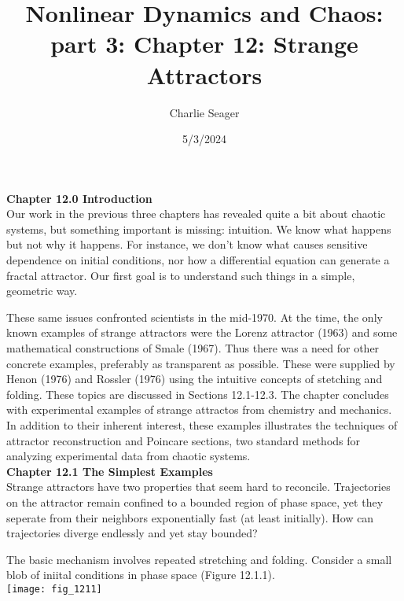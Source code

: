 \documentclass{article}
\newcommand\tab[1][1cm]{\hspace*{#1}}
\begin{document}
\title {Nonlinear Dynamics and Chaos: part 3: Chapter 12: Strange Attractors}

\author{Charlie Seager}

\date{5/3/2024}
\maketitle

\textbf {Chapter 12.0 Introduction} \\

Our work in the previous three chapters has revealed quite a bit about chaotic systems, but something important is missing: intuition. We know what happens but not why it happens. For instance, we don't know what causes sensitive dependence on initial conditions, nor how a differential equation can generate a fractal attractor. Our first goal is to understand such things in a simple, geometric way. \\ \tab

These same issues confronted scientists in the mid-1970. At the time, the only known examples of strange attractors were the Lorenz attractor (1963) and some mathematical constructions of Smale (1967). Thus there was a need for other concrete examples, preferably as transparent as possible. These were supplied by Henon (1976) and Rossler (1976) using the intuitive concepts of stetching and folding. These topics are discussed in Sections 12.1-12.3. The chapter concludes with experimental examples of strange attractos from chemistry and mechanics. In addition to their inherent interest, these examples illustrates the techniques of attractor reconstruction and Poincare sections, two standard methods for analyzing experimental data from chaotic systems. \\

\textbf {Chapter 12.1 The Simplest Examples} \\

Strange attractors have two properties that seem hard to reconcile. Trajectories on the attractor remain confined to a bounded region of phase space, yet they seperate from their neighbors exponentially fast (at least initially). How can trajectories diverge endlessly and yet stay bounded? \\ \tab

The basic mechanism involves repeated stretching and folding. Consider a small blob of iniital conditions in phase space (Figure 12.1.1). \\

\texttt{[image: fig\_1211]}
\end{document}
